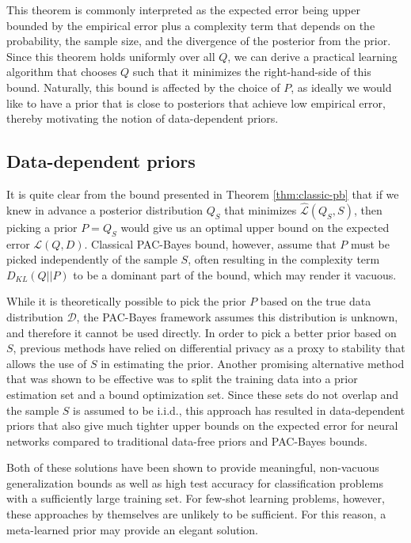 \documentclass{article}
\theoremstyle{definition}
\begin{document}
This theorem is commonly interpreted as the expected error being upper bounded by the empirical error plus a complexity term that depends on the probability, the sample size, and the divergence of the posterior from the prior. Since this theorem holds uniformly over all $Q$, we can derive a practical learning algorithm that chooses $Q$ such that it minimizes the right-hand-side of this bound. Naturally, this bound is affected by the choice of $P$, as ideally we would like to have a prior that is close to posteriors that achieve low empirical error, thereby motivating the notion of data-dependent priors.

\subsection{Data-dependent priors}

It is quite clear from the bound presented in Theorem \ref{thm:classic-pb} that if we knew in advance a posterior distribution $Q_S$ that minimizes $\hat{\mathcal{L}}(Q_S, S)$, then picking a prior $P=Q_S$ would give us an optimal upper bound on the expected error $\mathcal{L}(Q, D)$.
Classical PAC-Bayes bound, however, assume that $P$ must be picked independently of the sample $S$, often resulting in the complexity term $D_{KL}(Q||P)$ to be a dominant part of the bound, which may render it vacuous. 

While it is theoretically possible to pick the prior $P$ based on the true data distribution $\mathcal{D}$, the PAC-Bayes framework assumes this distribution is unknown, and therefore it cannot be used directly. In order to pick a better prior based on $S$, previous methods have relied on differential privacy \citep{Dziugaite2018} as a proxy to stability that allows the use of $S$ in estimating the prior. Another promising alternative method that was shown to be effective \citep{Dziugaite2017, Perez-Ortiz2021} was to split the training data into a prior estimation set and a bound optimization set. Since these sets do not overlap and the sample $S$ is assumed to be i.i.d., this approach has resulted in data-dependent priors that also give much tighter upper bounds on the expected error for neural networks compared to traditional data-free priors and PAC-Bayes bounds.

Both of these solutions have been shown to provide meaningful, non-vacuous generalization bounds as well as high test accuracy for classification problems with a sufficiently large training set. For few-shot learning problems, however, these approaches by themselves are unlikely to be sufficient. For this reason, a meta-learned prior may provide an elegant solution.
\end{document}
